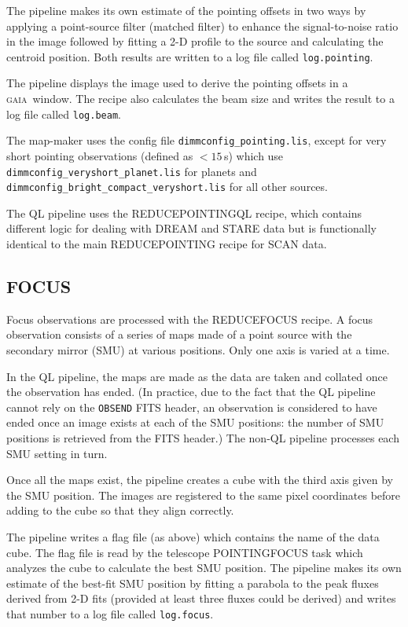 \documentclass[twoside,11pt]{article}
\renewcommand{\_}{\texttt{\symbol{95}}}
\newcommand{\GAIA}{\textsc{gaia}}
\newcommand{\task}[1]{\textsf{#1}}
\begin{document}
The pipeline makes its own estimate of the pointing offsets in two
ways by applying a point-source filter (matched filter) to enhance the
signal-to-noise ratio in the image followed by fitting a 2-D profile
to the source and calculating the centroid position. Both results are
written to a log file called \verb+log.pointing+.

The pipeline displays the image used to derive the pointing offsets in
a \GAIA\ window. The recipe also calculates the beam size and writes the
result to a log file called \verb+log.beam+.

The map-maker uses the config file \verb+dimmconfig_pointing.lis+,
except for very short pointing observations (defined as $<15$\,s)
which use \verb+dimmconfig_veryshort_planet.lis+ for planets and
\verb+dimmconfig_bright_compact_veryshort.lis+ for all other sources.

The QL pipeline uses the \task{REDUCE\_POINTING\_QL} recipe, which
contains different logic for dealing with DREAM and STARE data but is
functionally identical to the main \task{REDUCE\_POINTING} recipe for
SCAN data.

\subsection{FOCUS}

Focus observations are processed with the \task{REDUCE\_FOCUS}
recipe. A focus observation consists of a series of maps made of a
point source with the secondary mirror (SMU) at various
positions. Only one axis is varied at a time.

In the QL pipeline, the maps are made as the data are taken and
collated once the observation has ended. (In practice, due to the fact
that the QL pipeline cannot rely on the \verb+OBSEND+ FITS header, an
observation is considered to have ended once an image exists at each
of the SMU positions: the number of SMU positions is retrieved from
the FITS header.) The non-QL pipeline processes each SMU setting in
turn.

Once all the maps exist, the pipeline creates a cube with the third
axis given by the SMU position. The images are registered to the same
pixel coordinates before adding to the cube so that they align
correctly.

The pipeline writes a flag file (as above) which contains the name of
the data cube. The flag file is read by the telescope POINTING\_FOCUS
task which analyzes the cube to calculate the best SMU position. The
pipeline makes its own estimate of the best-fit SMU position by
fitting a parabola to the peak fluxes derived from 2-D fits (provided
at least three fluxes could be derived) and writes that number to a
log file called \verb+log.focus+.
\end{document}
